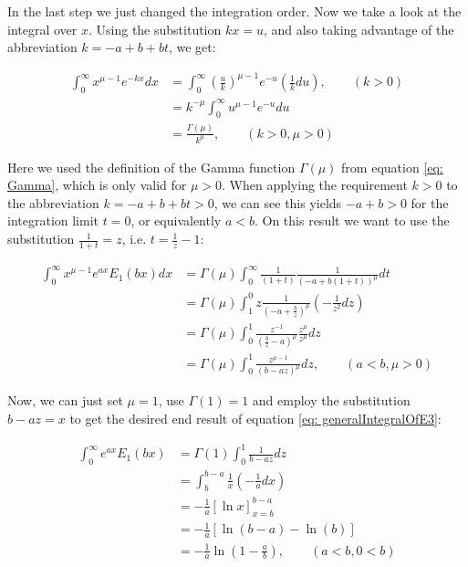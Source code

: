 \documentclass[bibliography=totocnumbered]{scrartcl}
\newcommand{\assume}[1][\text{MISSING PARAMETER}]{,\qquad\left(#1\right)}
\begin{document}
			In the last step we just changed the integration order. Now we take a look at the integral over $x$. Using the substitution $kx=u$, and also taking advantage of the abbreviation $k=-a+b+bt$, we get:
			
			\begin{align}
			\int_{0}^{\infty}x^{\mu-1}e^{-kx}dx&=\int_{0}^{\infty}\left(\frac{u}{k}\right)^{\mu-1}e^{-u}\left(\frac{1}{k}du\right)\assume[k>0]\\
			&=k^{-\mu}\int_{0}^{\infty}u^{\mu-1}e^{-u}du\\
			&=\frac{\Gamma\left(\mu\right)}{k^{\mu}}\assume[k>0, \mu>0]
			\end{align}
			
			Here we used the definition of the Gamma function $\Gamma\left(\mu\right)$ from equation \eqref{eq: Gamma}, which is only valid for $\mu>0$. When applying the requirement $k>0$ to the abbreviation $k=-a+b+bt>0$, we can see this yields $-a+b>0$ for the integration limit $t=0$, or equivalently $a<b$. On this result we want to use the substitution $\frac{1}{1+t}=z$, i.e. $t=\frac{1}{z}-1$:
			
			\begin{align}
			\int_{0}^{\infty}x^{\mu-1}e^{ax}E_1\left(bx\right)dx&=\Gamma\left(\mu\right)\int_{0}^{\infty}\frac{1}{\left(1+t\right)}\frac{1}{\left(-a+b\left(1+t\right)\right)^\mu}dt\\
			&=\Gamma\left(\mu\right)\int_{1}^{0}z\frac{1}{\left(-a+\frac{b}{z}\right)^{\mu}}\left(-\frac{1}{z^2}dz\right)\\
			&=\Gamma\left(\mu\right)\int_{0}^{1}\frac{z^{-1}}{\left(\frac{b}{z}-a\right)^{\mu}}\frac{z^{\mu}}{z^{\mu}}dz\\
			&=\Gamma\left(\mu\right)\int_{0}^{1}\frac{z^{\mu-1}}{\left(b-az\right)^{\mu}}dz\assume[a<b, \mu>0]
			\end{align}
			
			Now, we can just set $\mu=1$, use $\Gamma\left(1\right)=1$ and employ the substitution $b-az=x$ to get the desired end result of equation \eqref{eq: generalIntegralOfE3}:
			
			\begin{align}
			\int_{0}^{\infty}e^{ax}E_1\left(bx\right)&=\Gamma\left(1\right)\int_{0}^{1}\frac{1}{b-az}dz\\
			&=\int_{b}^{b-a}\frac{1}{x}\left(-\frac{1}{a}dx\right)\\
			&=-\frac{1}{a}\left[\ln{x}\right]^{b-a}_{x=b}\\
			&=-\frac{1}{a}\left[\ln{\left(b-a\right)}-\ln{\left(b\right)}\right]\\
			&=-\frac{1}{a}\ln{\left(1-\frac{a}{b}\right)}\assume[a<b, 0<b]
			\end{align}
\end{document}
